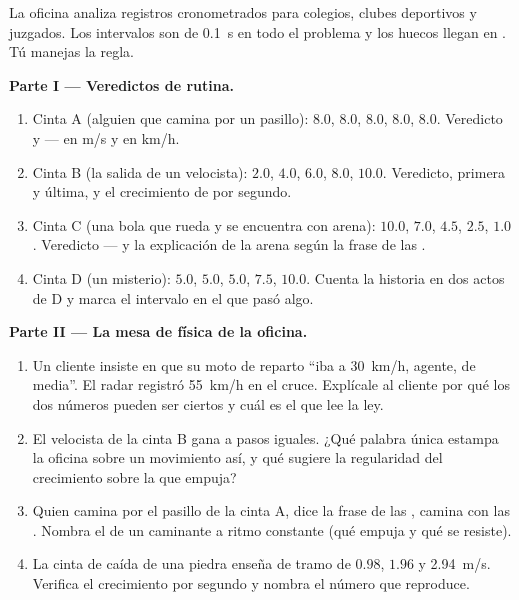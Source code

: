 \begin{problem}\label{pb:g9:uniform-varied-motion:1}
La oficina analiza registros cronometrados para colegios, clubes
deportivos y juzgados. Los intervalos son de \qty{0.1}{s} en todo el
problema y los huecos llegan en . Tú manejas la
regla.

\medskip\noindent\textbf{Parte I --- Veredictos de rutina.}
\begin{enumerate}
  \item Cinta A (alguien que camina por un pasillo): $8.0$, $8.0$,
        $8.0$, $8.0$, $8.0$. Veredicto y  --- en
        \unit{m/s} y en \unit{km/h}.
  \item Cinta B (la salida de un velocista): $2.0$, $4.0$, $6.0$,
        $8.0$, $10.0$. Veredicto,  primera y última,
        y el crecimiento de  por segundo.
  \item Cinta C (una bola que rueda y se encuentra con arena):
        $10.0$, $7.0$, $4.5$, $2.5$, $1.0$. Veredicto --- y la
        explicación de la arena según la frase de las .
  \item Cinta D (un misterio): $5.0$, $5.0$, $5.0$, $7.5$, $10.0$.
        Cuenta la historia en dos actos de D y marca el intervalo en
        el que pasó algo.
\end{enumerate}

\medskip\noindent\textbf{Parte II --- La mesa de física de la
oficina.}
\begin{enumerate}[resume]
  \item Un cliente insiste en que su moto de reparto ``iba a
        \qty{30}{km/h}, agente, de media''. El radar registró
        \qty{55}{km/h} en el cruce. Explícale al cliente por qué los
        dos números pueden ser ciertos y cuál es el que lee la ley.
  \item El velocista de la cinta B gana  a pasos
        iguales. ¿Qué palabra única estampa la oficina sobre un
        movimiento así, y qué sugiere la regularidad del crecimiento
        sobre la  que empuja?
  \item Quien camina por el pasillo de la cinta A, dice la frase de
        las , camina con las  . Nombra
        el  de un caminante a ritmo constante (qué empuja y
        qué se resiste).
  \item La cinta de caída de una piedra enseña  de
        tramo de $0.98$, $1.96$ y \qty{2.94}{m/s}. Verifica el
        crecimiento por segundo y nombra el número que reproduce.
\end{enumerate}


\end{problem}
